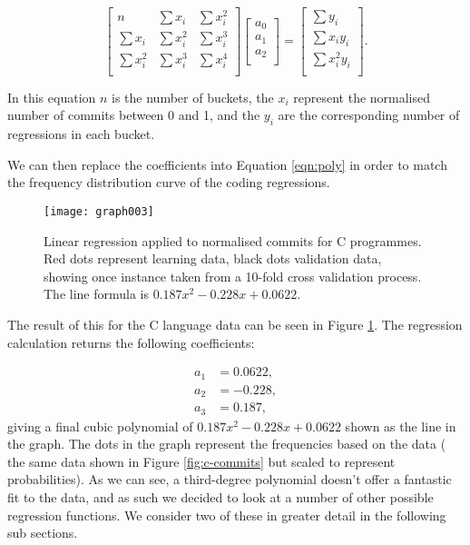 \documentclass[10pt,journal,compsoc]{IEEEtran}
\begin{document}
\begin{equation}
\begin{bmatrix}
n          & \sum x_i   & \sum x_i^2 \\
\sum x_i   & \sum x_i^2 & \sum x_i^3 \\
\sum x_i^2 & \sum x_i^3 & \sum x_i^4 \\
\end{bmatrix}
\begin{bmatrix}
a_0 \\
a_1 \\
a_2 \\
\end{bmatrix}
=
\begin{bmatrix}
\sum y_i \phantom{x_i} \\
\sum x_i y_i           \\
\sum x_i^2 y_i         \\
\end{bmatrix}.
\end{equation}

In this equation $n$ is the number of buckets, the $x_i$ represent the normalised number of commits between 0 and 1, and the $y_i$ are the corresponding number of regressions in each bucket.

We can then replace the coefficients into Equation \ref{eqn:poly} in order to match the frequency distribution curve of the coding regressions.

\begin{figure}[t]
\centering
\texttt{[image: graph003]}%
\caption{\label{fig:c-linear}Linear regression applied to normalised commits for C programmes. Red dots represent learning data, black dots validation data, showing once instance taken from a 10-fold cross validation process. The line formula is $0.187x^{2} - 0.228x + 0.0622$.}
\end{figure}

The result of this for the C language data can be seen in Figure \ref{fig:c-linear}. The regression calculation returns the following coefficients:

\begin{align*}
a_1 & = 0.0622, \\
a_2 & = -0.228, \\
a_3 & = 0.187,
\end{align*}
giving a final cubic polynomial of $0.187x^{2} - 0.228x + 0.0622$ shown as the line in the graph. The dots in the graph represent the frequencies based on the data (\ie\/ the same data shown in Figure \ref{fig:c-commits} but scaled to represent probabilities). As we can see, a third-degree polynomial doesn't offer a fantastic fit to the data, and as such we decided to look at a number of other possible regression functions. We consider two of these in greater detail in the following sub sections.
\end{document}
